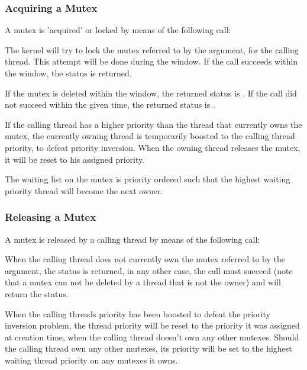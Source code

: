 \subsubsection{Acquiring a Mutex}

A mutex is 'acquired' or locked by means of the following call:


The kernel will try to lock the mutex referred to by the  argument,
for the calling thread. This attempt will be done during the 
window. If the call succeeds within the  window, the
 status is returned. 

If the mutex is deleted within the  window, the returned status is
. If the call did not succeed within the given time, the
returned status is .

If the calling thread has a higher priority than the thread that currently
owns the mutex, the currently owning thread is temporarily boosted to the
calling thread priority, to defeat priority inversion. When the owning
thread releases the mutex, it will be reset to his assigned priority.

The waiting list on the mutex is priority ordered such that the highest
waiting priority thread will become the next owner.

\subsubsection{Releasing a Mutex}

A mutex is released by a calling thread by means of the following call:


When the calling thread does
not currently own the mutex referred to by the  argument, the
 status is returned, in any other case, the call must
succeed (note that a mutex can not be deleted by a thread that is not the
owner) and will return the  status.

When the calling threads priority has been boosted to defeat the priority
inversion problem, the thread priority will be reset to the priority it
was assigned at creation time, when the calling thread doesn't own any other
mutexes. Should the calling thread own any other mutexes, its priority will
be set to the highest waiting thread priority on any mutexes it owns.

